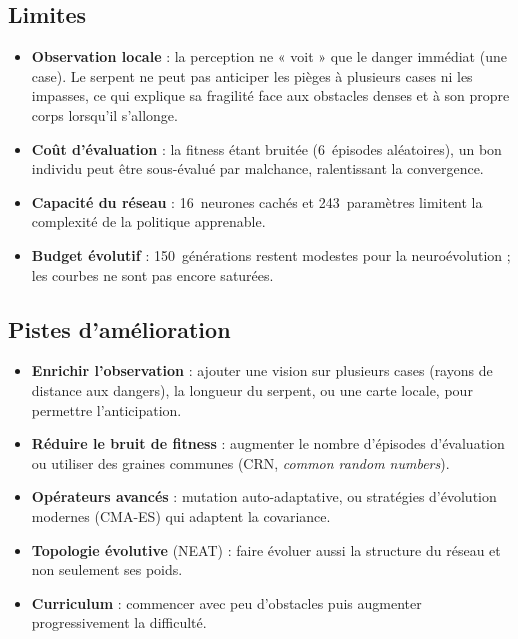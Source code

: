 \documentclass[11pt,a4paper]{article}
\begin{document}
\subsection{Limites}
\begin{itemize}[nosep]
  \item \textbf{Observation locale} : la perception ne « voit » que le danger
        immédiat (une case). Le serpent ne peut pas anticiper les pièges à
        plusieurs cases ni les impasses, ce qui explique sa fragilité face aux
        obstacles denses et à son propre corps lorsqu'il s'allonge.
  \item \textbf{Coût d'évaluation} : la fitness étant bruitée (6~épisodes
        aléatoires), un bon individu peut être sous-évalué par malchance,
        ralentissant la convergence.
  \item \textbf{Capacité du réseau} : 16~neurones cachés et 243~paramètres
        limitent la complexité de la politique apprenable.
  \item \textbf{Budget évolutif} : 150~générations restent modestes pour la
        neuroévolution ; les courbes ne sont pas encore saturées.
\end{itemize}

\subsection{Pistes d'amélioration}
\begin{itemize}[nosep]
  \item \textbf{Enrichir l'observation} : ajouter une vision sur plusieurs cases
        (rayons de distance aux dangers), la longueur du serpent, ou une carte
        locale, pour permettre l'anticipation.
  \item \textbf{Réduire le bruit de fitness} : augmenter le nombre d'épisodes
        d'évaluation ou utiliser des graines communes (CRN, \emph{common random
        numbers}).
  \item \textbf{Opérateurs avancés} : mutation auto-adaptative, ou stratégies
        d'évolution modernes (CMA-ES) qui adaptent la covariance.
  \item \textbf{Topologie évolutive} (NEAT) : faire évoluer aussi la structure du
        réseau et non seulement ses poids.
  \item \textbf{Curriculum} : commencer avec peu d'obstacles puis augmenter
        progressivement la difficulté.
\end{itemize}

\end{document}

